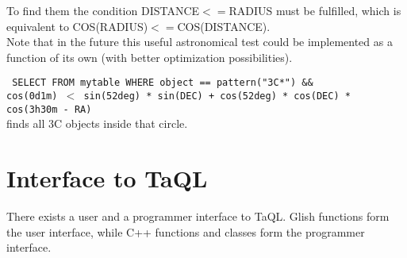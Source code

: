 \begin{description}
       To find them the condition DISTANCE$<=$RADIUS must be fulfilled,
       which is equivalent to COS(RADIUS)$<=$COS(DISTANCE).
       \\Note that in the future this useful astronomical test could
       be implemented as a function of its own (with better optimization
       possibilities).
  \item[] \texttt{ SELECT FROM mytable WHERE object == pattern("3C*") \&\&}
       \\\texttt{cos(0d1m) $<$ sin(52deg) * sin(DEC) + cos(52deg) *
        cos(DEC) * cos(3h30m - RA) }
       \\finds all 3C objects inside that circle.
\end{description}

\section{\label{TAQL:GLISHC}Interface to TaQL}
There exists a user and a programmer interface to TaQL.
Glish functions form the user interface, while C++ functions
and classes form the programmer interface.
